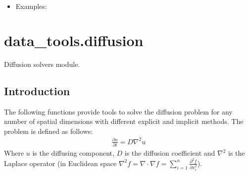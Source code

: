 \documentclass[letterpaper,10pt,english]{sphinxmanual}
\begin{document}
\begin{fulllineitems}
\begin{itemize}
\item {} \begin{description}
\item[{Examples:}] \leavevmode
\begin{sphinxVerbatim}[commandchars=\\\{\}]
  \PYG{p}{[}  \PYG{p}{]}
 
\end{sphinxVerbatim}

\end{description}

\end{itemize}

\end{fulllineitems}

\label{\detokenize{diffusion:module-data_tools.diffusion}}

\section{data\_tools.diffusion}
\label{\detokenize{diffusion:data-tools-diffusion}}\label{\detokenize{diffusion::doc}}
Diffusion solvers module.


\subsection{Introduction}
\label{\detokenize{diffusion:introduction}}
The following functions provide tools to solve the diffusion problem for
any number of spatial dimensions with different explicit and implicit
methods. The problem is defined as follows:
\begin{equation*}
\begin{split}\frac{\partial u}{\partial t} = D\nabla^2u\end{split}
\end{equation*}
Where \(u\) is the diffusing component, \(D\) is the diffusion
coefficient and \(\nabla^2\) is the Laplace operator
(in Euclidean space \(\nabla^2f=\nabla\cdot\nabla f=\sum_{i=1}^n\frac{\partial^2 f}{\partial x_i^2}\)).
\end{document}
